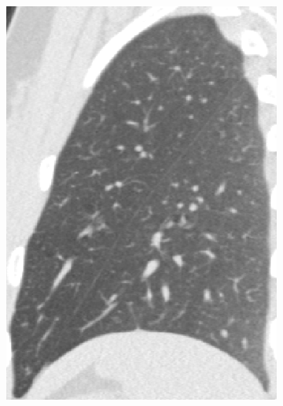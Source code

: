 {\begin{figure}[htbp]
\begin{subfigure}{.25\linewidth}
  \includegraphics[width=\linewidth,trim={{.0\wd0} {.0\wd0} {.0\wd0} {.0\wd0}},clip]{Segmentation/Image/H1335_FRC_Raw_Sagittal.png}
  \caption{}
  \label{fig:HLASegmentationResults-a} 
\end{subfigure}
\hspace{.3in} %
\begin{subfigure}{.25\linewidth}%

\end{subfigure}
\end{figure}}
